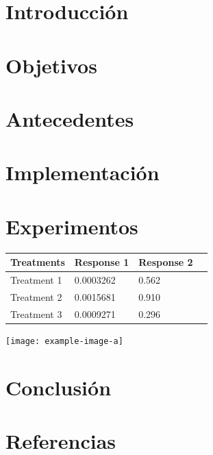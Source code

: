 \documentclass[a0,portrait]{a0poster}
\begin{document}
\begin{multicols}{2}
\Large
\section*{Introducción}
\blindtext[1]

\section*{Objetivos}
\blindtext[1]

\section*{Antecedentes}
\blindtext[1]

\section*{Implementación}
\blindtext[1]

\section*{Experimentos}
\blindtext[1]
%

\begin{center}\vspace{1cm}
    \begin{tabular}{l l l l}
    \toprule
    \textbf{Treatments} & \textbf{Response 1} & \textbf{Response 2} \\
    \midrule
    Treatment 1 & 0.0003262 & 0.562 \\
    Treatment 2 & 0.0015681 & 0.910 \\
    Treatment 3 & 0.0009271 & 0.296 \\
    \bottomrule
    \end{tabular}
\end{center}\vspace{1cm}

\begin{center}\vspace{1cm}
    \texttt{[image: example-image-a]}
\end{center}


\section*{Conclusión}
\blindtext[1]


\section*{Referencias}

\nocite{adam_opt}

\renewcommand\refname{\vskip -1cm}




\end{multicols}
\end{document}
